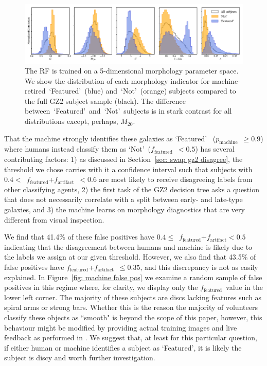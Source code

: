 \documentclass[twocolumn,  trackchanges,]{aastex6}%
\newcommand{\M}[1]{$M_{\mathrm{#1}}$}
\newcommand{\feat}{`Featured'}
\newcommand{\notfeat}{`Not'}
\newcommand{\pmachine}{$p_{\mathrm{machine}}$}
\newcommand{\ffeat}{$f_{\mathrm{featured}}$}
\newcommand{\fstar}{$f_{\mathrm{artifact}}$}
\begin{document}
\begin{figure}[t!]
\centering
\includegraphics[width=7in]{f10.pdf}
\caption{The RF is trained on a 5-dimensional morphology parameter space. We show the distribution of each morphology indicator for machine-retired~\feat~(blue) and~\notfeat~(orange) subjects compared to the full GZ2 subject sample (black). The difference between~\feat~and~\notfeat~subjects is in stark contrast for all distributions except, perhaps, \M{20}.  \label{fig: morph params}}
\end{figure}



That the machine strongly identifies these galaxies as \feat~
(\pmachine~$\ge 0.9$) where humans instead classify them as \notfeat~(\ffeat~$< 0.5$) 
has several contributing factors: 1) as discussed in Section~\ref{sec: swap gz2 disagree}, 
the threshold we chose carries with it a confidence interval such that subjects with 
$0.4 <$~\ffeat+\fstar~$< 0.6$ are most likely to receive disagreeing labels from 
other classifying agents, 2) the first task of the GZ2 decision tree asks a 
question that does not necessarily correlate with a split between early- and
 late-type galaxies, and 3) the machine learns on morphology diagnostics
 that are very different from visual inspection.

We find that 41.4\% of these false positives have $0.4 \le$~\ffeat+\fstar$<0.5$ 
indicating that the disagreement between humans and machine is likely due to the 
labels we assign at our given threshold. However, we also find that 43.5\% of false 
positives have \ffeat+\fstar~$\le0.35$, and this discrepancy is not as easily explained. 
 In Figure~\ref{fig: machine false pos} we examine a random sample of false positives 
in this regime where, for clarity, we display only the \ffeat~value in the lower left corner. 
The majority of these subjects are discs lacking features such as spiral arms or strong bars. 
Whether this is the reason the majority of volunteers classify these objects as 
``smooth" is beyond the scope of this paper, however, this behaviour might be 
modified by providing actual training images and live feedback as performed in
 \cite{Marshall2016}. We suggest that, at least for this particular question, 
if either human or machine identifies a subject as \feat, it is likely the subject 
is discy and worth further investigation.
\end{document}
